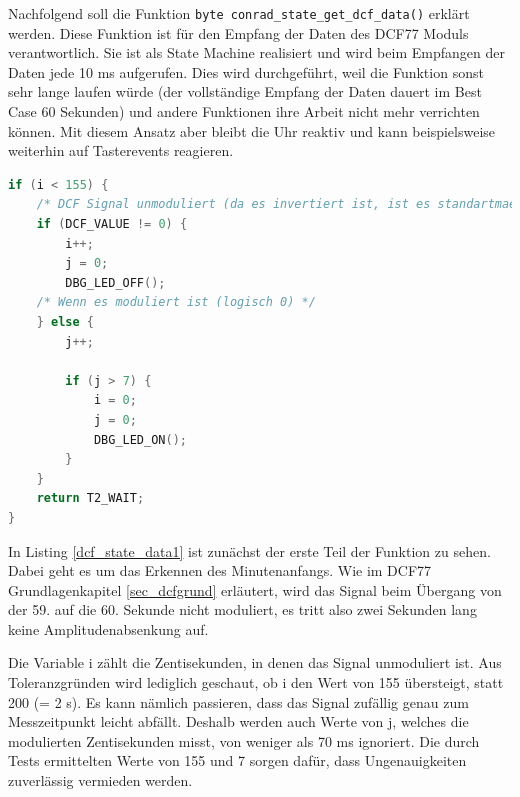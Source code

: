 Nachfolgend soll die Funktion \texttt{byte conrad\_state\_get\_dcf\_data()} erklärt werden. Diese Funktion ist für den Empfang der Daten des DCF77 Moduls verantwortlich. Sie ist als State Machine realisiert und wird beim Empfangen der Daten jede 10 ms aufgerufen. Dies wird durchgeführt, weil die Funktion sonst sehr lange laufen würde (der vollständige Empfang der Daten dauert im Best Case 60 Sekunden) und andere Funktionen ihre Arbeit nicht mehr verrichten können. Mit diesem Ansatz aber bleibt die Uhr reaktiv und kann beispielsweise weiterhin auf Tasterevents reagieren.
%
\begin{lstlisting}[language=C,label=dcf_state_data1,caption=Empfang des DCF77 Signals - Minutenstart erkennen]
if (i < 155) {
    /* DCF Signal unmoduliert (da es invertiert ist, ist es standartmaessig 1) */
    if (DCF_VALUE != 0) {
        i++;
        j = 0;
        DBG_LED_OFF();
    /* Wenn es moduliert ist (logisch 0) */
    } else {
        j++;

        if (j > 7) {
            i = 0;
            j = 0;
            DBG_LED_ON();
        }
    }
    return T2_WAIT;
}
\end{lstlisting}
%
In Listing \ref{dcf_state_data1} ist zunächst der erste Teil der Funktion zu sehen. Dabei geht es um das Erkennen des Minutenanfangs. Wie im DCF77 Grundlagenkapitel \ref{sec_dcfgrund} erläutert, wird das Signal beim Übergang von der 59. auf die 60. Sekunde nicht moduliert, es tritt also zwei Sekunden lang keine Amplitudenabsenkung auf.

Die Variable i zählt die Zentisekunden, in denen das Signal unmoduliert ist. Aus Toleranzgründen wird lediglich geschaut, ob i den Wert von 155 übersteigt, statt 200 (= 2 s). Es kann nämlich passieren, dass das Signal zufällig genau zum Messzeitpunkt leicht abfällt. Deshalb werden auch Werte von j, welches die modulierten Zentisekunden misst, von weniger als 70 ms ignoriert. Die durch Tests ermittelten Werte von 155 und 7 sorgen dafür, dass Ungenauigkeiten zuverlässig vermieden werden.

